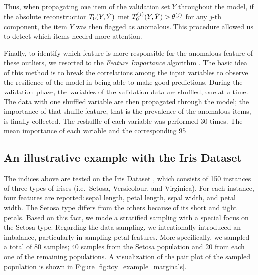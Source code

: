Thus, when propagating one item of the validation set $Y$ throughout the model, if the absolute reconstruction $T_0(Y, \Tilde{Y})$ met $T_{0}^{(j)}(Y, \Tilde{Y}) > \theta^{(j)}$ for any $j$-th component, the item $Y$ was then flagged as anomalous.
This procedure allowed us to detect which items needed more attention.

Finally, to identify which feature is more responsible for the anomalous feature of these outliers, we resorted to the \emph{Feature Importance} algorithm \cite[]{breiman2001random}.
The basic idea of this method is to break the correlations among the input variables to observe the resilience of the model in being able to make good predictions.
During the validation phase, the variables of the validation data are shuffled, one at a time. 
The data with one shuffled variable are then propagated through the model; the importance of that shuffle feature, that is the prevalence of the anomalous items, is finally collected.
The reshuffle of each variable was performed 30 times.
The mean importance of each variable and the corresponding 95\

\subsection{An illustrative example with the Iris Dataset}

The indices above are tested on the Iris Dataset \cite[]{fisher1936use}, which consists of 150 instances of three types of irises (i.e., Setosa, Versicolour, and Virginica). For each instance, four features are reported: sepal length, petal length, sepal width, and petal width.
The Setosa type differs from the others because of its short and tight petals.
Based on this fact, we made a stratified sampling with a special focus on the Setosa type.
Regarding the data sampling, we intentionally introduced an imbalance, particularly in sampling petal features. 
More specifically, we sampled a total of 80 samples; 40 samples from the Setosa population and 20 from each one of the remaining populations.
A visualization of the pair plot of the sampled population is shown in Figure \ref{fig:toy_example_marginals}.

